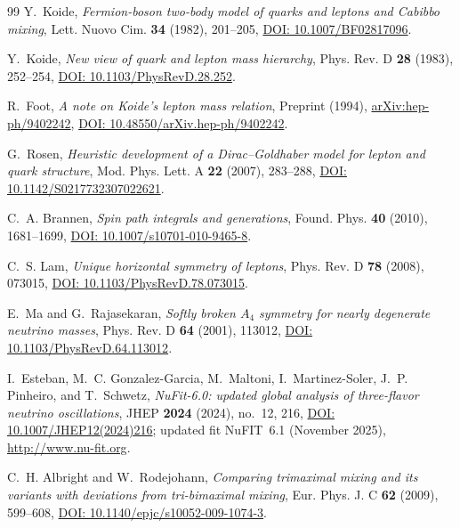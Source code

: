 \documentclass[11pt,a4paper,reqno]{amsart}
\theoremstyle{definition}
\numberwithin{equation}{section}
\begin{document}
\begin{thebibliography}{99}
Y.~Koide,
\emph{Fermion-boson two-body model of quarks and leptons and Cabibbo mixing},
Lett. Nuovo Cim. \textbf{34} (1982), 201--205, \href{https://doi.org/10.1007/BF02817096}{DOI: 10.1007/BF02817096}.

Y.~Koide,
\emph{New view of quark and lepton mass hierarchy},
Phys. Rev. D \textbf{28} (1983), 252--254, \href{https://doi.org/10.1103/PhysRevD.28.252}{DOI: 10.1103/PhysRevD.28.252}.

R.~Foot,
\emph{A note on Koide's lepton mass relation},
Preprint (1994), \href{https://arxiv.org/abs/hep-ph/9402242}{arXiv:hep-ph/9402242}, \href{https://doi.org/10.48550/arXiv.hep-ph/9402242}{DOI: 10.48550/arXiv.hep-ph/9402242}.

G.~Rosen,
\emph{Heuristic development of a Dirac--Goldhaber model for lepton and quark structure},
Mod. Phys. Lett. A \textbf{22} (2007), 283--288, \href{https://doi.org/10.1142/S0217732307022621}{DOI: 10.1142/S0217732307022621}.

C.~A. Brannen,
\emph{Spin path integrals and generations},
Found. Phys. \textbf{40} (2010), 1681--1699, \href{https://doi.org/10.1007/s10701-010-9465-8}{DOI: 10.1007/s10701-010-9465-8}.

C.~S. Lam,
\emph{Unique horizontal symmetry of leptons},
Phys. Rev. D \textbf{78} (2008), 073015, \href{https://doi.org/10.1103/PhysRevD.78.073015}{DOI: 10.1103/PhysRevD.78.073015}.

E.~Ma and G.~Rajasekaran,
\emph{Softly broken $A_4$ symmetry for nearly degenerate neutrino masses},
Phys. Rev. D \textbf{64} (2001), 113012, \href{https://doi.org/10.1103/PhysRevD.64.113012}{DOI: 10.1103/PhysRevD.64.113012}.

I.~Esteban, M.~C. Gonzalez-Garcia, M.~Maltoni, I.~Martinez-Soler, J.~P. Pinheiro, and T.~Schwetz,
\emph{NuFit-6.0: updated global analysis of three-flavor neutrino oscillations},
JHEP \textbf{2024} (2024), no.~12, 216, \href{https://doi.org/10.1007/JHEP12(2024)216}{DOI: 10.1007/JHEP12(2024)216}; updated fit NuFIT~6.1 (November 2025), \url{http://www.nu-fit.org}.

C.~H. Albright and W.~Rodejohann,
\emph{Comparing trimaximal mixing and its variants with deviations from tri-bimaximal mixing},
Eur. Phys. J. C \textbf{62} (2009), 599--608, \href{https://doi.org/10.1140/epjc/s10052-009-1074-3}{DOI: 10.1140/epjc/s10052-009-1074-3}.


\end{thebibliography}
\end{document}
